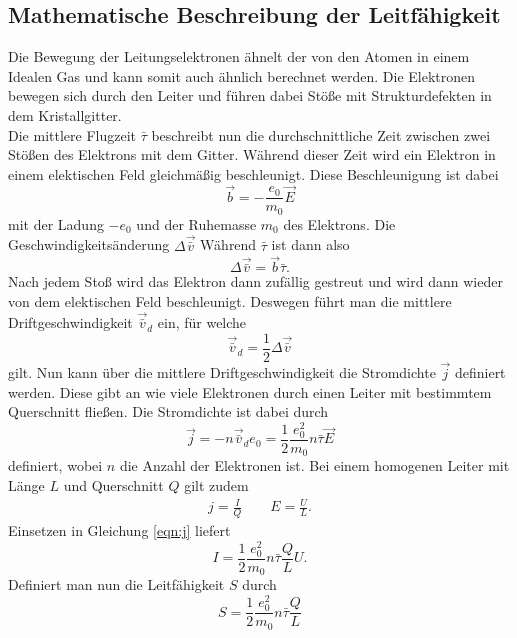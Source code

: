 \subsection{Mathematische Beschreibung der Leitfähigkeit}
Die Bewegung der Leitungselektronen ähnelt der von den Atomen in einem Idealen Gas und kann somit auch ähnlich
berechnet werden. Die Elektronen bewegen sich durch den Leiter und führen dabei Stöße mit Strukturdefekten in 
dem Kristallgitter.\\
Die mittlere Flugzeit $\bar{\tau}$ beschreibt nun die durchschnittliche Zeit zwischen zwei Stößen des Elektrons mit
dem Gitter. Während dieser Zeit wird ein Elektron in einem elektischen Feld gleichmäßig beschleunigt. Diese
Beschleunigung ist dabei
\begin{equation}
    \vec{b}=-\frac{e_0}{m_0}\vec{E}
\end{equation}
mit der Ladung $-e_0$ und der Ruhemasse $m_0$ des Elektrons. Die Geschwindigkeitsänderung $\Delta\vec{\bar{v}}$
Während $\bar{\tau}$ ist dann also
\begin{equation}
    \Delta\vec{\bar{v}}=\vec{b}\bar{\tau}.
\end{equation}
Nach jedem Stoß wird das Elektron dann zufällig gestreut und wird dann wieder von dem elektischen Feld
beschleunigt. Deswegen führt man die mittlere Driftgeschwindigkeit $\vec{\bar{v}}_d$ ein, für welche 
\begin{equation}
    \vec{\bar{v}}_d=\frac{1}{2}\Delta\vec{\bar{v}}
\end{equation}
gilt. Nun kann über die mittlere Driftgeschwindigkeit die Stromdichte $\vec{j}$ definiert werden. Diese gibt an
wie viele Elektronen durch einen Leiter mit bestimmtem Querschnitt fließen. Die Stromdichte ist dabei durch
\begin{equation}
    \vec{j}=-n \vec{\bar{v}}_d e_0
    =\frac{1}{2}\frac{e_0^2}{m_0}n\bar{\tau}\vec{E} \label{eqn:j}
\end{equation}
definiert, wobei $n$ die Anzahl der Elektronen ist. Bei einem homogenen Leiter mit Länge $L$ und Querschnitt
$Q$ gilt zudem
\begin{align}
    j=\frac{I}{Q} \qquad E=\frac{U}{L}.
\end{align}
Einsetzen in Gleichung \eqref{eqn:j} liefert
\begin{equation}
    I=\frac{1}{2}\frac{e_0^2}{m_0}n\bar{\tau}\frac{Q}{L}U. \label{eqn:I}
\end{equation}
Definiert man nun die Leitfähigkeit $S$ durch
\begin{equation}
    S=\frac{1}{2}\frac{e_0^2}{m_0}n\bar{\tau}\frac{Q}{L}
\end{equation}
